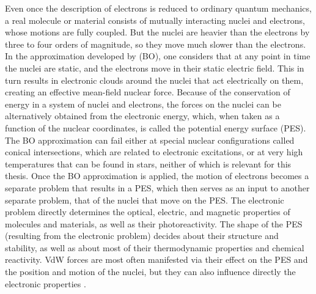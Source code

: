 Even once the description of electrons is reduced to ordinary quantum mechanics, a real molecule or material consists of mutually interacting nuclei and electrons, whose motions are fully coupled.
But the nuclei are heavier than the electrons by three to four orders of magnitude, so they move much slower than the electrons.
In the approximation developed by \citet{BornAP27} (BO), one considers that at any point in time the nuclei are static, and the electrons move in their static electric field.
This in turn results in electronic clouds around the nuclei that act electrically on them, creating an effective mean-field nuclear force.
Because of the conservation of energy in a system of nuclei and electrons, the forces on the nuclei can be alternatively obtained from the electronic energy, which, when taken as a function of the nuclear coordinates, is called the potential energy surface (PES).
The BO approximation can fail either at special nuclear configurations called conical intersections, which are related to electronic excitations, or at very high temperatures that can be found in stars, neither of which is relevant for this thesis.
Once the BO approximation is applied, the motion of electrons becomes a separate problem that results in a PES, which then serves as an input to another separate problem, that of the nuclei that move on the PES\@.
The electronic problem directly determines the optical, electric, and magnetic properties of molecules and materials, as well as their photoreactivity.
The shape of the PES (resulting from the electronic problem) decides about their structure and stability, as well as about most of their thermodynamic properties and chemical reactivity.
VdW forces are most often manifested via their effect on the PES and the position and motion of the nuclei, but they can also influence directly the electronic properties \citep{FerriPRL15}.

%

